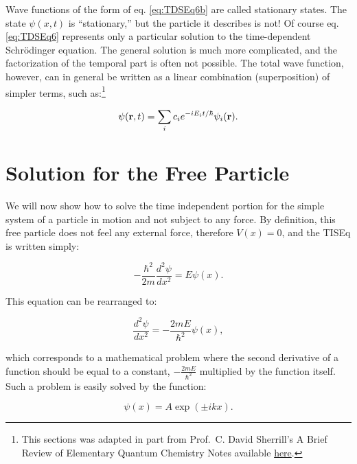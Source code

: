 \documentclass[
  9pt,
]{extbook}
\theoremstyle{definition}
\theoremstyle{definition}
\theoremstyle{definition}
\theoremstyle{remark}
\begin{document}
Wave functions of the form of eq. \eqref{eq:TDSEq6b} are called stationary states. The state \(\psi(x, t)\) is ``stationary,'' but the particle it describes is not!
Of course eq. \eqref{eq:TDSEq6} represents only a particular solution to the time-dependent Schrödinger equation. The general solution is much more complicated, and the factorization of the temporal part is often not possible. The total wave function, however, can in general be written as a linear combination (superposition) of simpler terms, such as:\footnote{This sections was adapted in part from Prof.~C. David Sherrill's A Brief Review of Elementary Quantum Chemistry Notes available \href{http://vergil.chemistry.gatech.edu/notes/quantrev/node1.html}{here}.}

\begin{equation}
\psi({\bf r}, t) = \sum_i c_i e^{-iE_it / \hbar} \psi_i({\bf r}).
\end{equation}

\hypertarget{solution-for-the-free-particle}{%
\section{Solution for the Free Particle}\label{solution-for-the-free-particle}}

We will now show how to solve the time independent portion for the simple system of a particle in motion and not subject to any force. By definition, this free particle does not feel any external force, therefore \(V(x)=0\), and the TISEq is written simply:

\begin{equation}
- \frac{\hbar^2}{2m} \frac{d^2\psi}{dx^2} = E \psi(x).
\label{eq:FP1}
\end{equation}

This equation can be rearranged to:

\begin{equation}
\frac{d^2\psi}{dx^2} =- \frac{2mE}{\hbar^2} \psi(x),
\label{eq:FP2}
\end{equation}

which corresponds to a mathematical problem where the second derivative of a function should be equal to a constant, \(- \frac{2mE}{\hbar^2}\) multiplied by the function itself. Such a problem is easily solved by the function:

\begin{equation}
\psi(x) = A \exp(\pm ikx).
\label{eq:FP3}
\end{equation}
\end{document}
